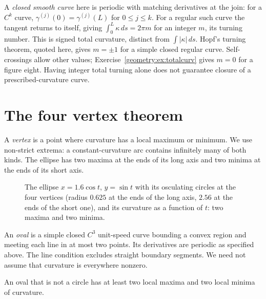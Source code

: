 A \emph{closed smooth curve} here is periodic with matching derivatives at the join: for a $C^k$ curve, $\gamma^{(j)}(0)=\gamma^{(j)}(L)$ for $0\le j\le k$. For a regular such curve the tangent returns to itself, giving $\int_0^L\kappa\,ds=2\pi m$ for an integer $m$, its turning number. This is signed total curvature, distinct from $\int|\kappa|\,ds$. Hopf's turning theorem, quoted here, gives $m=\pm1$ for a simple closed regular curve. Self-crossings allow other values; Exercise~\ref{geometry:ex:totalcurv} gives $m=0$ for a figure eight. Having integer total turning alone does not guarantee closure of a prescribed-curvature curve.

\section{The four vertex theorem}

A \emph{vertex} is a point where curvature has a local maximum or minimum. We use non-strict extrema: a constant-curvature arc contains infinitely many of both kinds. The ellipse has two maxima at the ends of its long axis and two minima at the ends of its short axis.

\begin{figure}[ht]
\centering
{}
\caption{The ellipse $x=1.6\cos t$, $y=\sin t$ with its osculating circles at the four vertices (radius $0.625$ at the ends of the long axis, $2.56$ at the ends of
the short one), and its curvature as a function of $t$: two maxima and two minima.}
\label{geometry:fig:vertices}
\end{figure}

An \emph{oval} is a simple closed $C^3$ unit-speed curve bounding a convex region and meeting each line in at most two points. Its derivatives are periodic as specified above. The line condition excludes straight boundary segments. We need not assume that curvature is everywhere nonzero.

\begin{theorem}\label{geometry:thm:fourvertex}
An oval that is not a circle has at least two local maxima and two local minima of curvature.
\end{theorem}

